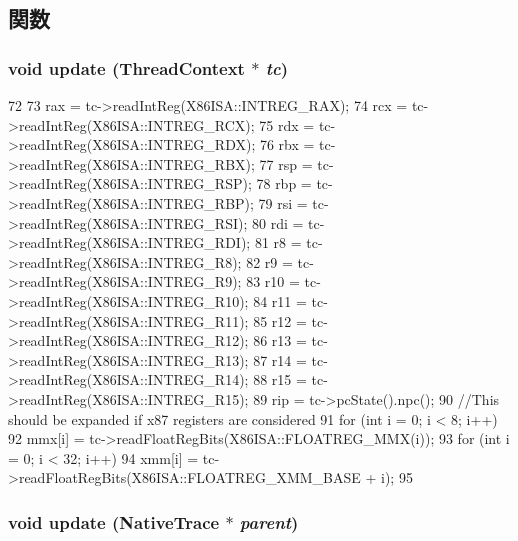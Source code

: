 \subsection{関数}
\hypertarget{structTrace_1_1X86NativeTrace_1_1ThreadState_ace3d3d91c61ce60aa033e666444d2301}{
\subsubsection[{update}]{\setlength{\rightskip}{0pt plus 5cm}void update ({\bf ThreadContext} $\ast$ {\em tc})}}
\label{structTrace_1_1X86NativeTrace_1_1ThreadState_ace3d3d91c61ce60aa033e666444d2301}



\begin{DoxyCode}
72 {
73     rax = tc->readIntReg(X86ISA::INTREG_RAX);
74     rcx = tc->readIntReg(X86ISA::INTREG_RCX);
75     rdx = tc->readIntReg(X86ISA::INTREG_RDX);
76     rbx = tc->readIntReg(X86ISA::INTREG_RBX);
77     rsp = tc->readIntReg(X86ISA::INTREG_RSP);
78     rbp = tc->readIntReg(X86ISA::INTREG_RBP);
79     rsi = tc->readIntReg(X86ISA::INTREG_RSI);
80     rdi = tc->readIntReg(X86ISA::INTREG_RDI);
81     r8 = tc->readIntReg(X86ISA::INTREG_R8);
82     r9 = tc->readIntReg(X86ISA::INTREG_R9);
83     r10 = tc->readIntReg(X86ISA::INTREG_R10);
84     r11 = tc->readIntReg(X86ISA::INTREG_R11);
85     r12 = tc->readIntReg(X86ISA::INTREG_R12);
86     r13 = tc->readIntReg(X86ISA::INTREG_R13);
87     r14 = tc->readIntReg(X86ISA::INTREG_R14);
88     r15 = tc->readIntReg(X86ISA::INTREG_R15);
89     rip = tc->pcState().npc();
90     //This should be expanded if x87 registers are considered
91     for (int i = 0; i < 8; i++)
92         mmx[i] = tc->readFloatRegBits(X86ISA::FLOATREG_MMX(i));
93     for (int i = 0; i < 32; i++)
94         xmm[i] = tc->readFloatRegBits(X86ISA::FLOATREG_XMM_BASE + i);
95 }
\end{DoxyCode}
\hypertarget{structTrace_1_1X86NativeTrace_1_1ThreadState_a85ec503b4f5d7eeddd8cda17abf92e24}{
\subsubsection[{update}]{\setlength{\rightskip}{0pt plus 5cm}void update ({\bf NativeTrace} $\ast$ {\em parent})}}
\label{structTrace_1_1X86NativeTrace_1_1ThreadState_a85ec503b4f5d7eeddd8cda17abf92e24}



